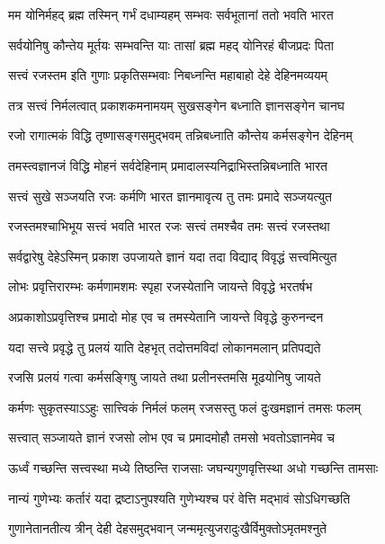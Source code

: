\twolineshloka
{मम योनिर्महद् ब्रह्म तस्मिन् गर्भं दधाम्यहम्}
{सम्भवः सर्वभूतानां ततो भवति भारत}%

\twolineshloka
{सर्वयोनिषु कौन्तेय मूर्तयः सम्भवन्ति याः}
{तासां ब्रह्म महद् योनिरहं बीजप्रदः पिता}%

\twolineshloka
{सत्त्वं रजस्तम इति गुणाः प्रकृतिसम्भवाः}
{निबध्नन्ति महाबाहो देहे देहिनमव्ययम्}%

\twolineshloka
{तत्र सत्त्वं निर्मलत्वात् प्रकाशकमनामयम्}
{सुखसङ्गेन बध्नाति ज्ञानसङ्गेन चानघ}%

\twolineshloka
{रजो रागात्मकं विद्धि तृष्णासङ्गसमुद्भवम्}
{तन्निबध्नाति कौन्तेय कर्मसङ्गेन देहिनम्}%

\twolineshloka
{तमस्त्वज्ञानजं विद्धि मोहनं सर्वदेहिनाम्}
{प्रमादालस्यनिद्राभिस्तन्निबध्नाति भारत}%

\twolineshloka
{सत्त्वं सुखे सञ्जयति रजः कर्मणि भारत}
{ज्ञानमावृत्य तु तमः प्रमादे सञ्जयत्युत}%

\twolineshloka
{रजस्तमश्चाभिभूय सत्त्वं भवति भारत}
{रजः सत्त्वं तमश्चैव तमः सत्त्वं रजस्तथा}%

\twolineshloka
{सर्वद्वारेषु देहेऽस्मिन् प्रकाश उपजायते}
{ज्ञानं यदा तदा विद्याद् विवृद्धं सत्त्वमित्युत}%

\twolineshloka
{लोभः प्रवृत्तिरारम्भः कर्मणामशमः स्पृहा}
{रजस्येतानि जायन्ते विवृद्धे भरतर्षभ}%

\twolineshloka
{अप्रकाशोऽप्रवृत्तिश्च प्रमादो मोह एव च}
{तमस्येतानि जायन्ते विवृद्धे कुरुनन्दन}%

\twolineshloka
{यदा सत्त्वे प्रवृद्धे तु प्रलयं याति देहभृत्}
{तदोत्तमविदां लोकानमलान् प्रतिपद्यते}%

\twolineshloka
{रजसि प्रलयं गत्वा कर्मसङ्गिषु जायते}
{तथा प्रलीनस्तमसि मूढयोनिषु जायते}%

\twolineshloka
{कर्मणः सुकृतस्याऽऽहुः सात्त्विकं निर्मलं फलम्}
{रजसस्तु फलं दुःखमज्ञानं तमसः फलम्}%

\twolineshloka
{सत्त्वात् सञ्जायते ज्ञानं रजसो लोभ एव च}
{प्रमादमोहौ तमसो भवतोऽज्ञानमेव च}%

\twolineshloka
{ऊर्ध्वं गच्छन्ति सत्त्वस्था मध्ये तिष्ठन्ति राजसाः}
{जघन्यगुणवृत्तिस्था अधो गच्छन्ति तामसाः}%

\twolineshloka
{नान्यं गुणेभ्यः कर्तारं यदा द्रष्टाऽनुपश्यति}
{गुणेभ्यश्च परं वेत्ति मद्भावं सोऽधिगच्छति}%

\twolineshloka
{गुणानेतानतीत्य त्रीन् देही देहसमुद्भवान्}
{जन्ममृत्युजरादुःखैर्विमुक्तोऽमृतमश्नुते}%

